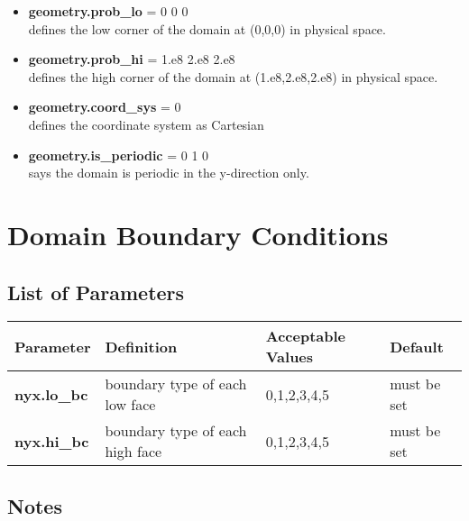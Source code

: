 \begin{itemize}

\item {\bf geometry.prob\_lo} = 0 0 0 \\
defines the low corner of the domain at (0,0,0) in physical space.  

\item {\bf geometry.prob\_hi} = 1.e8 2.e8 2.e8 \\
defines the high corner of the domain at (1.e8,2.e8,2.e8) in physical space.  

\item {\bf geometry.coord\_sys} = 0 \\
defines the coordinate system as Cartesian 

\item {\bf geometry.is\_periodic} = 0 1 0 \\
says the domain is periodic in the y-direction only. 

\end{itemize}

\section{Domain Boundary Conditions}

\subsection{List of Parameters}

\begin{table*}[h]
\begin{scriptsize}
\begin{center}
\begin{tabular}{|l|l|l|l|} \hline
Parameter & Definition & Acceptable Values &Default\\
\hline
{\bf nyx.lo\_bc} & boundary type of each low face  & 0,1,2,3,4,5 & must be set \\
{\bf nyx.hi\_bc} & boundary type of each high face & 0,1,2,3,4,5 & must be set \\
\hline
\end{tabular}
\label{Table:BC}
\end{center}
\end{scriptsize}
\end{table*}

\subsection{Notes}


